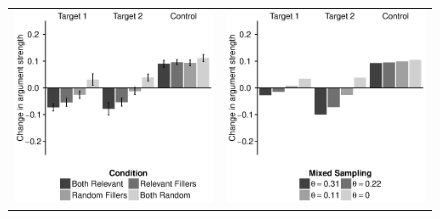 \documentclass[doc,12pt]{apa}
\begin{document}
\begin{figure}[htbp]
\begin{center}
\begin{tabular}{cc}
\includegraphics[scale=0.60]{results.eps} &
\includegraphics[scale=0.60]{fits.eps} \\

\end{tabular}
\end{center}
\end{figure}
\end{document}
